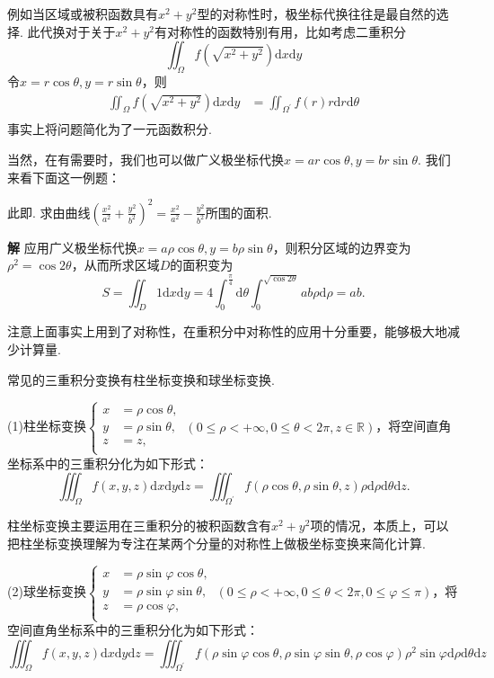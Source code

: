 \documentclass{ctexart}
\newenvironment{custom}[1]{\par\noindent \textbf{#1}\quad}{\par\vspace{1em}}
\begin{document}
例如当区域或被积函数具有$x^{2}+y^{2}$型的对称性时，极坐标代换往往是最自然的选择. 此代换对于关于$x^{2}+y^{2}$有对称性的函数特别有用，比如考虑二重积分
$$\iint_{\Omega}{f(\sqrt{x^{2}+y^{2}})\mathrm{d}x\mathrm{d}y}$$
令$x=r\cos{\theta},y=r\sin{\theta}$，则
$$\begin{aligned}\iint_{\Omega}{f(\sqrt{x^{2}+y^{2}})\mathrm{d}x\mathrm{d}y}&=\iint_{\Omega^{\prime}}{f(r)r\mathrm{d}r\mathrm{d}\theta}\\\end{aligned}$$
事实上将问题简化为了一元函数积分.

当然，在有需要时，我们也可以做广义极坐标代换$x=ar\cos{\theta},y=br\sin{\theta}$. 我们来看下面这一例题：

\begin{example}
此即\cite[例题22.2.7]{XHM}. 求由曲线$\left(\frac{x^{2}}{a^{2}}+\frac{y^{2}}{b^{2}}\right)^{2}=\frac{x^{2}}{a^{2}}-\frac{y^{2}}{b^{2}}$所围的面积.
\end{example}

\begin{custom}{解}
应用广义极坐标代换$x=a\rho\cos{\theta},y=b\rho\sin{\theta}$，则积分区域的边界变为$\rho^{2}=\cos{2\theta}$，从而所求区域$D$的面积变为
$$S=\iint_{D}{1\mathrm{d}x\mathrm{d}y}=4\int_{0}^{\frac{\pi}{4}}{\mathrm{d}\theta\int_{0}^{\sqrt{\cos{2\theta}}}{ab\rho\mathrm{d}\rho}}=ab.$$
\end{custom}

注意上面事实上用到了对称性，在重积分中对称性的应用十分重要，能够极大地减少计算量.

常见的三重积分变换有柱坐标变换和球坐标变换.

(1)柱坐标变换$\left\{\begin{aligned}x&=\rho\cos{\theta},\\y&=\rho\sin{\theta},\\z&=z,\\\end{aligned}\right.\,(0\leqslant \rho<+\infty, 0\leqslant\theta<2\pi,z\in\mathbb{R})$，将空间直角坐标系中的三重积分化为如下形式：
$$\iiint_{\Omega}{f(x,y,z)\mathrm{d}x\mathrm{d}y\mathrm{d}z}=\iiint_{\Omega^{\prime}}{f(\rho\cos{\theta},\rho\sin{\theta},z)\rho\mathrm{d}\rho\mathrm{d}\theta\mathrm{d}z}.$$

柱坐标变换主要运用在三重积分的被积函数含有$x^{2}+y^{2}$项的情况，本质上，可以把柱坐标变换理解为专注在某两个分量的对称性上做极坐标变换来简化计算.

(2)球坐标变换$\left\{\begin{aligned}x&=\rho\sin{\varphi}\cos{\theta},\\y&=\rho\sin{\varphi}\sin{\theta},\\z&=\rho\cos{\varphi},\\\end{aligned}\right.\,(0\leqslant\rho<+\infty,0\leqslant\theta<2\pi,0\leqslant\varphi\leqslant\pi)$，将空间直角坐标系中的三重积分化为如下形式：
$$\iiint_{\Omega}{f(x,y,z)\mathrm{d}x\mathrm{d}y\mathrm{d}z}=\iiint_{\Omega^{\prime}}{f(\rho\sin{\varphi}\cos{\theta},\rho\sin{\varphi}\sin{\theta},\rho\cos{\varphi})\rho^{2}\sin{\varphi}\mathrm{d}\rho\mathrm{d}\theta\mathrm{d}z}$$
\end{document}
